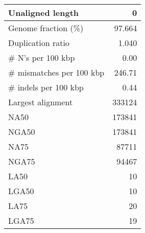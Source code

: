 \documentclass[12pt,a4paper]{article}
\begin{document}
\begin{table}[ht]
\begin{center}
\begin{tabular}{|l*{1}{|r}|}
Unaligned length & 0 \\ \hline
Genome fraction (\%) & 97.664 \\ \hline
Duplication ratio & 1.040 \\ \hline
\# N's per 100 kbp & 0.00 \\ \hline
\# mismatches per 100 kbp & 246.71 \\ \hline
\# indels per 100 kbp & 0.44 \\ \hline
Largest alignment & 333124 \\ \hline
NA50 & 173841 \\ \hline
NGA50 & 173841 \\ \hline
NA75 & 87711 \\ \hline
NGA75 & 94467 \\ \hline
LA50 & 10 \\ \hline
LGA50 & 10 \\ \hline
LA75 & 20 \\ \hline
LGA75 & 19 \\ \hline
\end{tabular}
\end{center}
\end{table}
\end{document}
